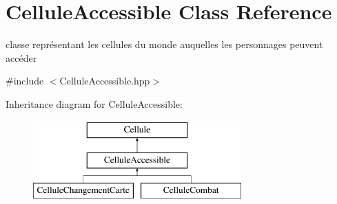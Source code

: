 \hypertarget{classCelluleAccessible}{\section{Cellule\-Accessible Class Reference}
\label{classCelluleAccessible}
}


classe représentant les cellules du monde auquelles les personnages peuvent accéder  




{\ttfamily \#include $<$Cellule\-Accessible.\-hpp$>$}

Inheritance diagram for Cellule\-Accessible\-:\begin{figure}[H]
\begin{center}
\leavevmode
\includegraphics[height=3.000000cm]{classCelluleAccessible}
\end{center}
\end{figure}
